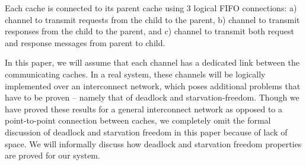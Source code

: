 Each cache is connected to its parent cache using 3 logical FIFO connections: a)
\cpReq{} channel to transmit requests from the child to the parent, b) \cpResp{}
channel to transmit responses from the child to the parent, and c) \pc{}
channel to transmit both request and response messages from
parent to child.


In this paper, we will assume that each channel has a dedicated link between
the communicating caches. In a real system, these channels will be logically
implemented over an interconnect network, which poses additional problems that
have to be proven -- namely that of deadlock and starvation-freedom. Though we
have proved these results for a general interconnect network as opposed to a
point-to-point connection between caches, we completely omit the formal
discussion of deadlock and starvation freedom in this paper because of lack of
space. We will informally discuss how deadlock and starvation freedom
properties are proved for our system.

